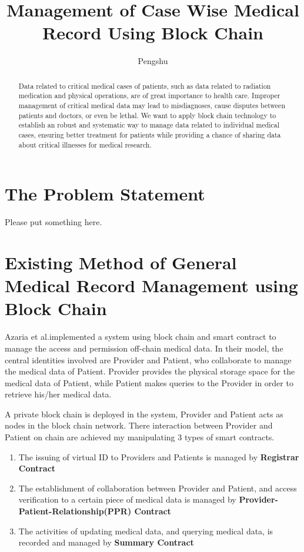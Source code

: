 \documentclass[]{scrartcl}
\title{Management of Case Wise Medical Record Using Block Chain}
\author{Pengshu}
\begin{document}
\maketitle

\begin{abstract}
Data related to critical medical cases of patients, such as data related to radiation medication and physical operations, are of great importance to health care. Improper management of critical medical data may lead to misdiagnoses, cause disputes between patients and doctors, or even be lethal. We want to apply block chain technology to establish an robust and systematic way to manage data related to individual medical cases, ensuring better treatment for patients while providing a chance of sharing data about critical illnesses for medical research.
\end{abstract}

\section{The Problem Statement}
Please put something here.

\section{Existing Method of General Medical Record Management using Block Chain}
Azaria et al.\cite{MedRecWhitePaper}implemented a system using block chain and smart contract to manage the access and permission off-chain medical data. In their model, the central identities involved are Provider and Patient, who collaborate to manage the medical data of Patient. Provider provides the physical storage space for the medical data of Patient, while Patient makes queries to the Provider in order to retrieve his/her medical data. 

A private block chain is deployed in the system, Provider and Patient acts as nodes in the block chain network. There interaction between Provider and Patient on chain are achieved my manipulating 3 types of smart contracts. 

\begin{enumerate}
\item The issuing of virtual ID to Providers and Patients is managed by \textbf{Registrar Contract}

\item The establishment of collaboration between Provider and Patient, and access verification to a certain piece of medical data is managed by \textbf{Provider-Patient-Relationship(PPR) Contract}

\item The activities of updating medical data, and querying medical data, is recorded and managed by \textbf{Summary Contract}
\end{enumerate}
\end{document}
